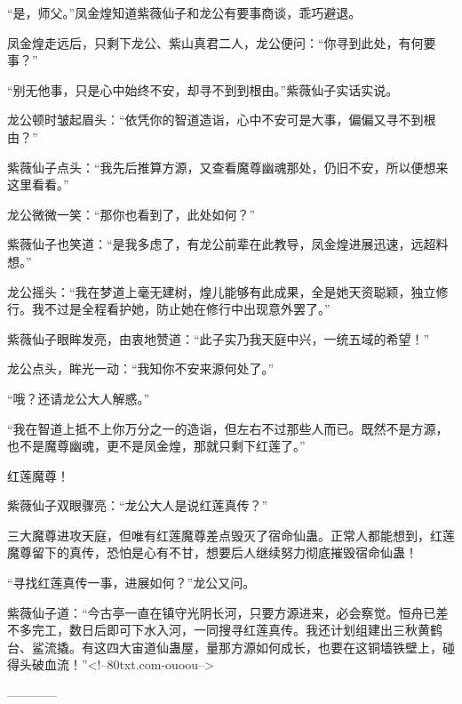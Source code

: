 \begin{this_body}
“是，师父。”凤金煌知道紫薇仙子和龙公有要事商谈，乖巧避退。

凤金煌走远后，只剩下龙公、紫山真君二人，龙公便问：“你寻到此处，有何要事？”

“别无他事，只是心中始终不安，却寻不到到根由。”紫薇仙子实话实说。

龙公顿时皱起眉头：“依凭你的智道造诣，心中不安可是大事，偏偏又寻不到根由？”

紫薇仙子点头：“我先后推算方源，又查看魔尊幽魂那处，仍旧不安，所以便想来这里看看。”

龙公微微一笑：“那你也看到了，此处如何？”

紫薇仙子也笑道：“是我多虑了，有龙公前辈在此教导，凤金煌进展迅速，远超料想。”

龙公摇头：“我在梦道上毫无建树，煌儿能够有此成果，全是她天资聪颖，独立修行。我不过是全程看护她，防止她在修行中出现意外罢了。”

紫薇仙子眼眸发亮，由衷地赞道：“此子实乃我天庭中兴，一统五域的希望！”

龙公点头，眸光一动：“我知你不安来源何处了。”

“哦？还请龙公大人解惑。”

“我在智道上抵不上你万分之一的造诣，但左右不过那些人而已。既然不是方源，也不是魔尊幽魂，更不是凤金煌，那就只剩下红莲了。”

红莲魔尊！

紫薇仙子双眼骤亮：“龙公大人是说红莲真传？”

三大魔尊进攻天庭，但唯有红莲魔尊差点毁灭了宿命仙蛊。正常人都能想到，红莲魔尊留下的真传，恐怕是心有不甘，想要后人继续努力彻底摧毁宿命仙蛊！

“寻找红莲真传一事，进展如何？”龙公又问。

紫薇仙子道：“今古亭一直在镇守光阴长河，只要方源进来，必会察觉。恒舟已差不多完工，数日后即可下水入河，一同搜寻红莲真传。我还计划组建出三秋黄鹤台、鲨流撬。有这四大宙道仙蛊屋，量那方源如何成长，也要在这铜墙铁壁上，碰得头破血流！”<!--80txt.com-ouoou-->

------------

\end{this_body}

